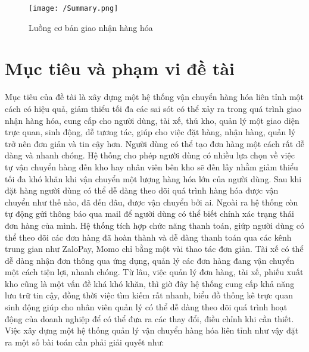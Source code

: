 	\begin{figure}[H]
		\texttt{[image: /Summary.png]}
		\centering
		\linebreak
		\caption{Luồng cơ bản giao nhận hàng hóa}
	\end{figure}
	
	
	\section{Mục tiêu và phạm vi đề tài}
	    Mục tiêu của đề tài là xây dựng một hệ thống vận chuyển hàng hóa liên tỉnh một cách có hiệu quả, giảm thiểu tối đa các sai sót có thể xảy ra trong quá trình giao nhận hàng hóa, cung cấp cho người dùng, tài xế, thủ kho, quản lý một giao diện trực quan, sinh động, dễ tương tác, giúp cho việc đặt hàng, nhận hàng, quản lý trở nên đơn giản và tin cậy hơn. Người dùng có thể tạo đơn hàng một cách rất dễ dàng và nhanh chóng. Hệ thống cho phép người dùng có nhiều lựa chọn về việc tự vận chuyển hàng đến kho hay nhân viên bên kho sẽ đến lấy nhằm giảm thiểu tối đa khó khăn khi vận chuyển một lượng hàng hóa lớn của người dùng. Sau khi đặt hàng người dùng có thể dễ dàng theo dõi quá trình hàng hóa được vận chuyển như thế nào, đã đến đâu, được vận chuyển bởi ai. Ngoài ra hệ thống còn tự động gửi thông báo qua mail để người dùng có thể biết chính xác trạng thái đơn hàng của mình. Hệ thống tích hợp chức năng thanh toán, giứp người dùng có thể theo dõi các đơn hàng đã hoàn thành và dễ dàng thanh toán qua các kênh trung gian như ZaloPay, Momo chỉ bằng một vài thao tác đơn giản. Tài xế có thể dễ dàng nhận đơn thông qua ứng dụng, quản lý các đơn hàng đang vận chuyển một cách tiện lợi, nhanh chóng. Từ lâu, việc quản lý đơn hàng, tài xế, phiếu xuất kho cũng là một vấn đề khá khó khăn, thì giờ đây hệ thống cung cấp khả năng lưu trữ tin cậy, đồng thời việc tìm kiếm rất nhanh, biểu đồ thống kê trực quan sinh động giúp cho nhân viên quản lý có thể dễ dàng theo dõi quá trình hoạt động của doanh nghiệp để có thể đưa ra các thay đổi, điều chỉnh khi cần thiết.
	    Việc xây dựng một hệ thống quản lý vận chuyển hàng hóa liên tỉnh như vậy đặt ra một số bài toán cần phải giải quyết như:
